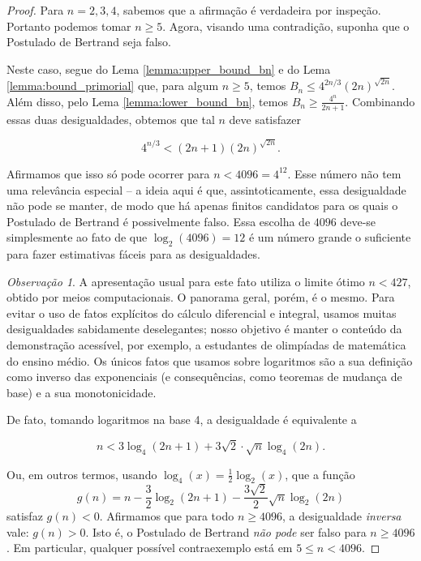 \documentclass[11pt]{article}
\theoremstyle{remark}
\newtheorem{remark}[theorem]{Observação}
\newcommand{\vs}{\vspace{10px}}
\begin{document}
\begin{proof}
    Para $n =2, 3, 4$, sabemos que a afirmação é verdadeira por inspeção. Portanto podemos tomar $n\ge 5$. Agora, visando uma contradição, suponha que o Postulado de Bertrand seja falso.

    Neste caso, segue do Lema \ref{lemma:upper_bound_bn} e do Lema \ref{lemma:bound_primorial} que, para algum $n\ge 5$, temos $B_n\le4^{2n/3}(2n)^{\sqrt{2n}}$. Além disso, pelo Lema \ref{lemma:lower_bound_bn}, temos $B_n\ge \frac{4^n}{2n+1}$. Combinando essas duas desigualdades, obtemos que tal $n$ deve satisfazer
    
    \[
    4^{n/3}
    <
    (2n+1)(2n)^{\sqrt{2n}}.
    \]

    Afirmamos que isso só pode ocorrer para $n< 4096=4^{12}$. Esse número não tem uma relevância especial -- a ideia aqui é que, assintoticamente, essa desigualdade não pode se manter, de modo que há apenas finitos candidatos para os quais o Postulado de Bertrand é possivelmente falso. Essa escolha de $4096$ deve-se simplesmente ao fato de que $\log_2(4096)=12$ é um número grande o suficiente para fazer estimativas fáceis para as desigualdades.
    
    \begin{remark}
    A apresentação usual para este fato utiliza o limite ótimo $n<427$, obtido por meios computacionais. O panorama geral, porém, é o mesmo. Para evitar o uso de fatos explícitos do cálculo diferencial e integral, usamos muitas desigualdades sabidamente deselegantes; nosso objetivo é manter o conteúdo da demonstração acessível, por exemplo, a estudantes de olimpíadas de matemática do ensino médio. Os únicos fatos que usamos sobre logaritmos são a sua definição como inverso das exponenciais (e consequências, como teoremas de mudança de base) e a sua monotonicidade.
    \end{remark}
    \vs
    
    De fato, tomando logaritmos na base 4, a desigualdade é equivalente a  

    \[n < 3\log_4(2n+1)+3\sqrt{2}\cdot\sqrt{n}\log_4(2n).\]

    Ou, em outros termos, usando $\log_4(x)=\frac12 \log_2(x)$, que a função 
    \[
    g(n) = n - \frac{3}{2}\log_2(2n+1) - \frac{3\sqrt{2}}{2}\sqrt{n}\log_2(2n)
    \]
    satisfaz $g(n) < 0$. Afirmamos que para todo $n\ge 4096$, a desigualdade \textit{inversa} vale: $g(n)>0$. Isto é, o Postulado de Bertrand \textit{não pode} ser falso para $n\ge 4096$. Em particular, qualquer possível contraexemplo está em $5\le n<4096$.\vs


\end{proof}
\end{document}
